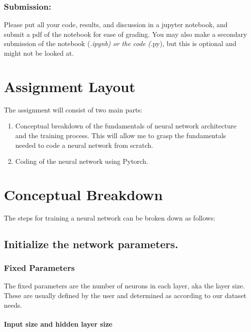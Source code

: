 \documentclass[11pt]{article}
\begin{document}
\subsubsection*{Submission:}\label{submission}

Please put all your code, results, and discussion in a jupyter notebook,
and submit a pdf of the notebook for ease of grading. You may also make
a secondary submission of the notebook (\emph{.ipynb) or the code
(}.py), but this is optional and might not be looked at.

    \section*{Assignment Layout}\label{assignment-layout}

The assignment will consist of two main parts:

\begin{enumerate}
\def\labelenumi{\arabic{enumi}.}
\item
  Conceptual breakdown of the fundamentals of neural network
  architecture and the training process. This will allow me to grasp the
  fundamentals needed to code a neural network from scratch.
\item
  Coding of the neural network using Pytorch.
\end{enumerate}

    \section{Conceptual Breakdown}\label{conceptual-breakdown}

The steps for training a neural network can be broken down as follows:

    \subsection{Initialize the network
parameters.}\label{initialize-the-network-parameters.}

\subsubsection{Fixed Parameters}\label{fixed-parameters}

The fixed parameters are the number of neurons in each layer, aka the
layer size. These are usually defined by the user and determined as
according to our dataset needs.

\paragraph{Input size and hidden layer
size}\label{input-size-and-hidden-layer-size}
\end{document}
